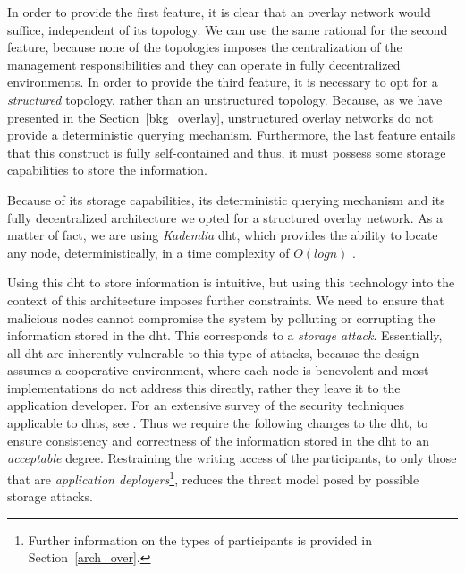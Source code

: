 \documentclass[12pt, titlepage]{uo_temp}
\begin{document}
     In order to provide the first feature, it is clear that an overlay network would
     suffice, independent of its topology. We can use the same rational for the second
     feature, because none of the topologies imposes the centralization of the management
     responsibilities and they can operate in fully decentralized environments. In order
     to provide the third feature, it is necessary to opt for a \emph{structured}
     topology, rather than an unstructured topology. Because, as we have presented in the
     Section~\ref{bkg_overlay}, unstructured overlay networks do not provide a
     deterministic querying mechanism. Furthermore, the last feature entails that this
     construct is fully self-contained and thus, it must possess some storage capabilities
     to store the information.
     
     Because of its storage capabilities, its deterministic querying mechanism and its
     fully decentralized architecture we opted for a structured overlay network.  As a
     matter of fact, we are using \emph{Kademlia} \gls{dht}, which provides the ability to
     locate any node, deterministically, in a time complexity of $O(log n)$
     \cite{maymounkov2002kademlia}.

     Using this \gls{dht} to store information is intuitive, but using this technology
     into the context of this architecture imposes further constraints. We need to ensure
     that malicious nodes cannot compromise the system by polluting or corrupting the
     information stored in the \gls{dht}. This corresponds to a \emph{storage attack}.
     Essentially, all \gls{dht} are inherently vulnerable to this type of attacks, because
     the design assumes a cooperative environment, where each node is benevolent and most
     implementations do not address this directly, rather they leave it to the application
     developer. For an extensive survey of the security techniques applicable to
     \gls{dht}s, see \cite{urdaneta2011survey}. Thus we require the following changes to
     the \gls{dht}, to ensure consistency and correctness of the information stored in the
     \gls{dht} to an \emph{acceptable} degree. Restraining the writing access of the
     participants, to only those that are \emph{application deployers}\footnote{Further
       information on the types of participants is provided in Section~\ref{arch_over}.},
     reduces the threat model posed by possible storage attacks.
\end{document}
